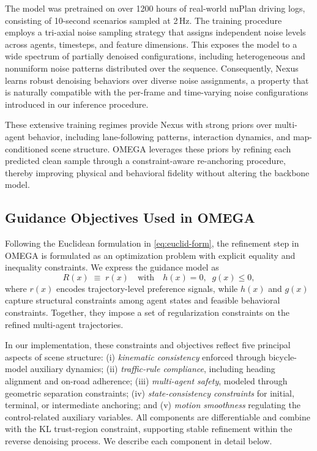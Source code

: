 \documentclass[10pt,twocolumn,letterpaper]{article}
\theoremstyle{plain}
\theoremstyle{remark}
\begin{document}
The model was pretrained on over
{1200 hours of real-world nuPlan driving logs}, consisting 
of 10-second scenarios sampled at 2\,Hz. The training 
procedure employs a {tri-axial noise sampling} strategy that 
assigns independent noise levels across agents, timesteps, and 
feature dimensions.  This exposes the model to a wide spectrum of 
partially denoised configurations, including heterogeneous and 
nonuniform noise patterns distributed over the sequence.  
Consequently, Nexus learns robust denoising behaviors over diverse 
noise assignments, a property that is naturally compatible with 
the per-frame and time-varying noise configurations introduced in 
our inference procedure.  

These extensive training regimes provide Nexus with strong priors 
over multi-agent behavior, including lane-following patterns, 
interaction dynamics, and map-conditioned scene structure.  
OMEGA leverages these priors by refining each predicted clean 
sample through a constraint-aware re-anchoring procedure, thereby 
improving physical and behavioral fidelity without altering the backbone model.

\subsection{Guidance Objectives Used in OMEGA}
\label{app:guidance}

Following the Euclidean formulation in \cref{eq:euclid-form}, the
refinement step in OMEGA is formulated as an optimization problem with explicit equality and inequality constraints. We express the guidance model as
\[
R(x) \;\equiv\; r(x) \quad\text{with}\quad h(x)=0,\;\; g(x)\le 0,
\]
where \(r(x)\) encodes trajectory-level preference signals, while
\(h(x)\) and \(g(x)\) capture structural constraints among agent states and feasible behavioral constraints.  Together, they impose a set of regularization constraints on the refined multi-agent trajectories.

In our implementation, these constraints and objectives reflect five principal aspects of scene structure:  
(i) \textit{kinematic consistency} enforced through bicycle-model auxiliary dynamics;  
(ii) \textit{traffic-rule compliance}, including heading alignment
and on-road adherence;  
(iii) \textit{multi-agent safety}, modeled through geometric
separation constraints;  
(iv) \textit{state-consistency constraints} for initial, terminal,
or intermediate anchoring; and  
(v) \textit{motion smoothness} regulating the control-related auxiliary variables.  
All components are differentiable and combine with
the KL trust-region constraint, supporting stable refinement within
the reverse denoising process. We describe each component in detail below.
\end{document}
